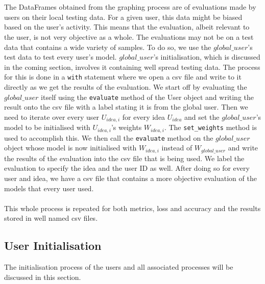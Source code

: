 \documentclass[12pt]{article}
\begin{document}
\\\\
The DataFrames obtained from the graphing process are of evaluations made by users on their local testing data. For a given user, this data might be biased based on the user's activity. This means that the evaluation, albeit relevant to the user, is not very objective as a whole. The evaluations may not be on a test data that contains a wide variety of samples. To do so, we use the $global\_user$'s test data to test every user's model. $global\_user$'s initialisation, which is discussed in the coming section, involves it containing well spread testing data. The process for this is done in a \texttt{with} statement where we open a csv file and write to it directly as we get the results of the evaluation. We start off by evaluating the $global\_user$ itself using the \texttt{evaluate} method of the User object and writing the result onto the csv file with a label stating it is from the global user. Then we need to iterate over every user $U_{idea,i}$ for every idea $U_{idea}$ and set the $global\_user$'s model to be initialised with $U_{idea,i}$'s weights $W_{idea,i}$. The \texttt{set\_weights} method is used to accomplish this. We then call the \texttt{evaluate} method on the $global\_user$ object whose model is now initialised with $W_{idea,i}$ instead of $W_{global\_user}$ and write the results of the evaluation into the csv file that is being used. We label the evaluation to specify the idea and the user ID as well. After doing so for every user and idea, we have a csv file that contains a more objective evaluation of the models that every user used. 
\\\\
This whole process is repeated for both metrics, loss and accuracy and the results stored in well named csv files. 
\subsection{User Initialisation}
The initialisation process of the users and all associated processes will be discussed in this section.
\end{document}
